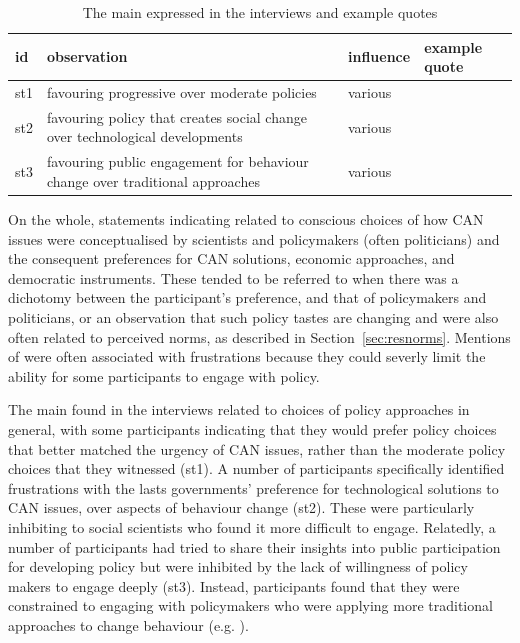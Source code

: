 \begin{table}[!ht]
\footnotesize
\caption{The main \ismst{} expressed in the interviews and example quotes}\label{tab:restastes}
\begin{tabular}{L{.06\linewidth}L{.3\linewidth}L{.12\linewidth}L{.52\linewidth}} \hline
\textbf{id} & \textbf{observation} & \textbf{influence} & \textbf{example quote} \\ \hline \hline
st1 & favouring progressive over moderate policies & various &  \\[5mm]
st2 & favouring policy that creates social change over technological developments & various &  \\[5mm]
st3 & favouring public engagement for behaviour change over traditional approaches & various &  \\[5mm]
 \hline
\end{tabular}
\end{table}

On the whole, statements indicating \ismst{} related to conscious choices of how CAN issues were conceptualised by scientists and policymakers (often politicians) and the consequent preferences for CAN solutions, economic approaches, and democratic instruments. These tended to be referred to when there was a dichotomy between the participant's preference, and that of policymakers and politicians, or an observation that such policy tastes are changing and were also often related to perceived norms, as described in Section~\ref{sec:resnorms}. Mentions of \ismst{} were often associated with frustrations because they could severly limit the ability for some participants to engage with policy.

The main \ismst{} found in the interviews related to choices of policy approaches in general, with some participants indicating that they would prefer policy choices that better matched the urgency of CAN issues, rather than the moderate policy choices that they witnessed (st1). A number of participants specifically identified frustrations with the lasts governments' preference for technological solutions to CAN issues, over aspects of behaviour change (st2). These were particularly inhibiting to social scientists who found it more difficult to engage. Relatedly, a number of participants had tried to share their insights into public participation for developing policy but were inhibited by the lack of willingness of policy makers to engage deeply (st3). Instead, participants found that they were constrained to engaging with policymakers who were applying more traditional approaches to change behaviour (e.g. ).

